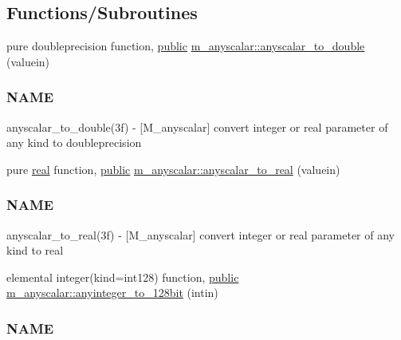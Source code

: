 \subsection*{Functions/\+Subroutines}
\begin{DoxyCompactItemize}
\item 
pure doubleprecision function, \hyperlink{M__stopwatch_83_8txt_a2f74811300c361e53b430611a7d1769f}{public} \hyperlink{namespacem__anyscalar_a6173dbc57e7c5a96f5961d9e83e6e15e}{m\+\_\+anyscalar\+::anyscalar\+\_\+to\+\_\+double} (valuein)
\begin{DoxyCompactList}\small\item\em \subsubsection*{N\+A\+ME}

anyscalar\+\_\+to\+\_\+double(3f) -\/ \mbox{[}M\+\_\+anyscalar\mbox{]} convert integer or real parameter of any kind to doubleprecision \end{DoxyCompactList}\item 
pure \hyperlink{read__watch_83_8txt_abdb62bde002f38ef75f810d3a905a823}{real} function, \hyperlink{M__stopwatch_83_8txt_a2f74811300c361e53b430611a7d1769f}{public} \hyperlink{namespacem__anyscalar_a39cd9a778fff85974fa1a822b92555fd}{m\+\_\+anyscalar\+::anyscalar\+\_\+to\+\_\+real} (valuein)
\begin{DoxyCompactList}\small\item\em \subsubsection*{N\+A\+ME}

anyscalar\+\_\+to\+\_\+real(3f) -\/ \mbox{[}M\+\_\+anyscalar\mbox{]} convert integer or real parameter of any kind to real \end{DoxyCompactList}\item 
elemental integer(kind=int128) function, \hyperlink{M__stopwatch_83_8txt_a2f74811300c361e53b430611a7d1769f}{public} \hyperlink{namespacem__anyscalar_a513beeccb5c821157cbd2eea8a1d9842}{m\+\_\+anyscalar\+::anyinteger\+\_\+to\+\_\+128bit} (intin)
\begin{DoxyCompactList}\small\item\em \subsubsection*{N\+A\+ME}\end{DoxyCompactList}\end{DoxyCompactItemize}
